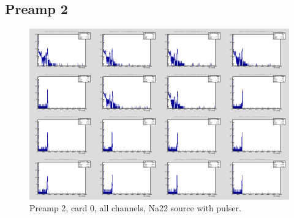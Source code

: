 \documentclass{report}
\begin{document}
\subsection{Preamp 2}
\begin{figure}[!htb]
  \includegraphics[width=\linewidth]{preamp2_lim_energy_card0_all.png}
  \caption{Preamp 2, card 0, all channels, Na22 source  with pulser.}
\end{figure}
\end{document}
